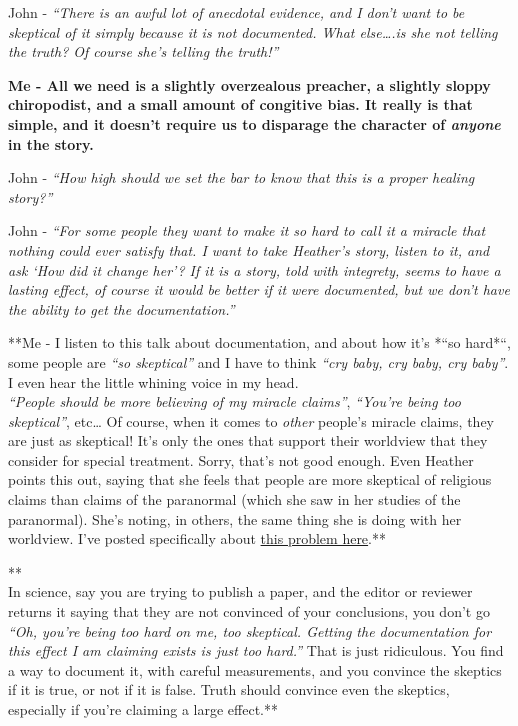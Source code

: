 John - \emph{``There is an awful lot of anecdotal evidence, and I don't
want to be skeptical of it simply because it is not documented. What
else\ldots{}.is she not telling the truth? Of course she's telling the
truth!''}

\textbf{Me - All we need is a slightly overzealous preacher, a slightly
sloppy chiropodist, and a small amount of congitive bias. It really is
that simple, and it doesn't require us to disparage the character of
\emph{anyone} in the story.}

John - \emph{``How high should we set the bar to know that this is a
proper healing story?''}

John - \emph{``For some people they want to make it so hard to call it a
miracle that nothing could ever satisfy that. I want to take Heather's
story, listen to it, and ask `How did it change her'? If it is a story,
told with integrety, seems to have a lasting effect, of course it would
be better if it were documented, but we don't have the ability to get
the documentation.''}

**Me - I listen to this talk about documentation, and about how it's
*``so hard*``, some people are \emph{``so skeptical''} and I have to
think \emph{``cry baby, cry baby, cry baby''}. I even hear the little
whining voice in my head.\\\emph{``People should be more believing of my
miracle claims''}, \emph{``You're being too skeptical''}, etc\ldots{} Of
course, when it comes to \emph{other} people's miracle claims, they are
just as skeptical! It's only the ones that support their worldview that
they consider for special treatment. Sorry, that's not good enough. Even
Heather points this out, saying that she feels that people are more
skeptical of religious claims than claims of the paranormal (which she
saw in her studies of the paranormal). She's noting, in others, the same
thing she is doing with her worldview. I've posted specifically about
\href{https://brianblais.wordpress.com/2012/09/25/naturalistic-bias-presupposing-naturalism/}{this
problem here}.**

**\\In science, say you are trying to publish a paper, and the editor or
reviewer returns it saying that they are not convinced of your
conclusions, you don't go \emph{``Oh, you're being too hard on me, too
skeptical. Getting the documentation for this effect I am claiming
exists is just too hard.''} That is just ridiculous. You find a way to
document it, with careful measurements, and you convince the skeptics if
it is true, or not if it is false. Truth should convince even the
skeptics, especially if you're claiming a large effect.**

